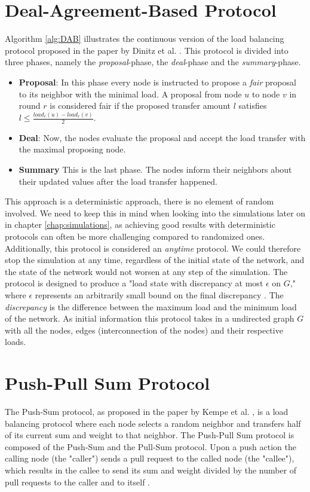 

\section{Deal-Agreement-Based Protocol}
Algorithm \ref{alg:DAB} illustrates the continuous version of the load balancing protocol proposed in the paper by Dinitz et al. \cite{dinitz2022localDealAgreementloadBalancing}. This protocol is divided into three phases, namely the \textit{proposal}-phase, the \textit{deal}-phase and the \textit{summary}-phase.
\begin{itemize}
    \item \textbf{Proposal}: In this phase every node is instructed to propose a \textit{fair} proposal to its neighbor with the minimal load. A proposal from node $u$ to node $v$ in round $r$ is considered fair if the proposed transfer amount $l$ satisfies $l \leq \frac{load_{r}(u) - load_{r}(v)}{2}$.
    \item \textbf{Deal}: Now, the nodes evaluate the proposal and accept the load transfer with the maximal proposing node.
    \item \textbf{Summary} This is the last phase. The nodes inform their neighbors about their updated values after the load transfer happened.
\end{itemize}
This approach is a deterministic approach, there is no element of random involved. We need to keep this in mind when looking into the simulations later on in chapter \ref{chap:simulations}, as achieving good results with deterministic protocols can often be more challenging compared to randomized ones. Additionally, this protocol is considered an \textit{anytime} protocol. We could therefore stop the simulation at any time, regardless of the initial state of the network, and the state of the network would not worsen at any step of the simulation. The protocol is designed to produce a "load state with discrepancy at most $\epsilon$ on $G$," where $\epsilon$ represents an arbitrarily small bound on the final discrepancy \cite{dinitz2022localDealAgreementloadBalancing}. The \textit{discrepancy} is the difference between the maximum load and the minimum load of the network. As initial information this protocol takes in a undirected graph $G$ with all the nodes, edges (interconnection of the nodes) and their respective loads.

\section{Push-Pull Sum Protocol}
The Push-Sum protocol, as proposed in the paper by Kempe et al. \cite{kempe2003gossipbasedComp}, is a load balancing protocol where each node selects a random neighbor and transfers half of its current sum and weight to that neighbor. The Push-Pull Sum protocol is composed of the Push-Sum and the Pull-Sum protocol. Upon a push action the calling node (the "caller") sends a pull request to the called node (the "callee"), which results in the callee to send its sum and weight divided by the number of pull requests to the caller and to itself \cite{nugroho2023PushPullSumDataAg}.

